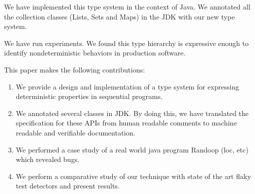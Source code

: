 We have implemented this type system in the context of Java.
We annotated all the collection
classes (Lists, Sets and Maps) in the JDK with our new type system.

We have run experiments.
We found this type hierarchy
is expressive enough to identify nondeterministic behaviors in production software.

This paper makes the following contributions:
\begin{enumerate}
	\item We provide a design and implementation of a type system for expressing deterministic properties in sequential programs.
	\item We annotated several classes in JDK. By doing this, we have translated the specification for these APIs from
	human readable comments to machine readable and verifiable documentation.
	\item We performed a case study of a real world java program Randoop (loc, etc) which revealed bugs.
	\item We perform a comparative study of our technique with state of the art flaky test detectors and present results.
\end{enumerate}

